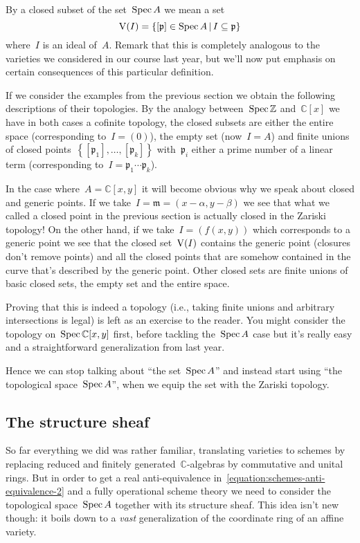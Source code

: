 By a closed subset of the set~$\operatorname{Spec} A$ we mean a set
\begin{equation}
  \operatorname{V}(I)=\left\{ [\mathfrak{p}]\in\operatorname{Spec} A\,|\,I\subseteq\mathfrak{p} \right\}
\end{equation}
where~$I$ is an ideal of~$A$. Remark that this is completely analogous to the varieties we considered in our course last year, but we'll now put emphasis on certain consequences of this particular definition.

If we consider the examples from the previous section we obtain the following descriptions of their topologies. By the analogy between~$\operatorname{Spec}\mathbb{Z}$ and~$\mathbb{C}[x]$ we have in both cases a cofinite topology, the closed subsets are either the entire space (corresponding to~$I=(0)$), the empty set (now~$I=A$) and finite unions of closed points~$\left\{ [\mathfrak{p}_1],\ldots,[\mathfrak{p}_k] \right\}$ with~$\mathfrak{p}_i$ either a prime number of a linear term (corresponding to~$I=\mathfrak{p}_1\cdots\mathfrak{p}_k$).

In the case where~$A=\mathbb{C}[x,y]$ it will become obvious why we speak about closed and generic points. If we take~$I=\mathfrak{m}=(x-\alpha,y-\beta)$ we see that what we called a closed point in the previous section is actually closed in the Zariski topology! On the other hand, if we take~$I=(f(x,y))$ which corresponds to a generic point we see that the closed set~$\operatorname{V}(I)$ contains the generic point (closures don't remove points) and all the closed points that are somehow contained in the curve that's described by the generic point. Other closed sets are finite unions of basic closed sets, the empty set and the entire space.

Proving that this is indeed a topology (i.e., taking finite unions and arbitrary intersections is legal) is left as an exercise to the reader. You might consider the topology on~$\operatorname{Spec}\mathbb{C}[x,y]$ first, before tackling the~$\operatorname{Spec} A$ case but it's really easy and a straightforward generalization from last year.

Hence we can stop talking about ``the set~$\operatorname{Spec} A$'' and instead start using ``the topological space~$\operatorname{Spec} A$'', when we equip the set with the Zariski topology.


\subsection{The structure sheaf}
So far everything we did was rather familiar, translating varieties to schemes by replacing reduced and finitely generated~$\mathbb{C}$-algebras by commutative and unital rings. But in order to get a real anti-equivalence in~\eqref{equation:schemes-anti-equivalence-2} and a fully operational scheme theory we need to consider the topological space~$\operatorname{Spec} A$ together with its structure sheaf. This idea isn't new though: it boils down to a \emph{vast} generalization of the coordinate ring of an affine variety.

